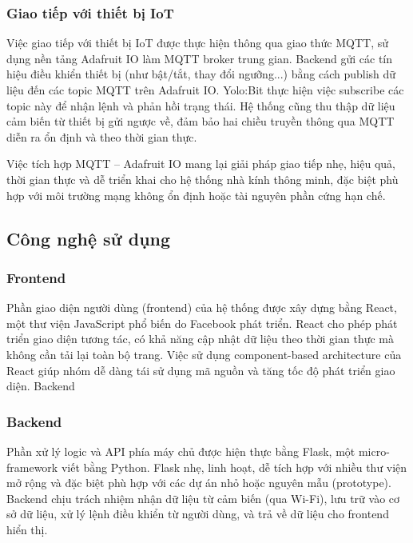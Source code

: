 \subsubsection{Giao tiếp với thiết bị IoT} 

Việc giao tiếp với thiết bị IoT được thực hiện thông qua giao thức MQTT, sử dụng nền tảng Adafruit IO làm MQTT broker trung gian. Backend gửi các tín hiệu điều khiển thiết bị (như bật/tắt, thay đổi ngưỡng...) bằng cách publish dữ liệu đến các topic MQTT trên Adafruit IO. Yolo:Bit thực hiện việc subscribe các topic này để nhận lệnh và phản hồi trạng thái. Hệ thống cũng thu thập dữ liệu cảm biến từ thiết bị gửi ngược về, đảm bảo hai chiều truyền thông qua MQTT diễn ra ổn định và theo thời gian thực.

Việc tích hợp MQTT – Adafruit IO mang lại giải pháp giao tiếp nhẹ, hiệu quả, thời gian thực và dễ triển khai cho hệ thống nhà kính thông minh, đặc biệt phù hợp với môi trường mạng không ổn định hoặc tài nguyên phần cứng hạn chế.

\subsection{Công nghệ sử dụng}

\subsubsection{Frontend}

Phần giao diện người dùng (frontend) của hệ thống được xây dựng bằng React, một thư viện JavaScript phổ biến do Facebook phát triển. React cho phép phát triển giao diện tương tác, có khả năng cập nhật dữ liệu theo thời gian thực mà không cần tải lại toàn bộ trang. Việc sử dụng component-based architecture của React giúp nhóm dễ dàng tái sử dụng mã nguồn và tăng tốc độ phát triển giao diện.
Backend

\subsubsection{Backend}

Phần xử lý logic và API phía máy chủ được hiện thực bằng Flask, một micro-framework viết bằng Python. Flask nhẹ, linh hoạt, dễ tích hợp với nhiều thư viện mở rộng và đặc biệt phù hợp với các dự án nhỏ hoặc nguyên mẫu (prototype). Backend chịu trách nhiệm nhận dữ liệu từ cảm biến (qua Wi-Fi), lưu trữ vào cơ sở dữ liệu, xử lý lệnh điều khiển từ người dùng, và trả về dữ liệu cho frontend hiển thị.

